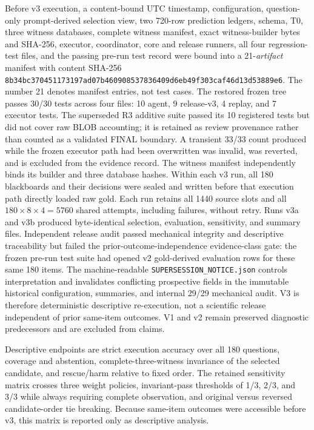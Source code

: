 \documentclass[applsci,article,submit,moreauthors]{Definitions/mdpi}
\begin{document}
Before v3 execution, a content-bound UTC timestamp, configuration, question-only prompt-derived selection view, two 720-row prediction ledgers, schema, T0, three witness databases, complete witness manifest, exact witness-builder bytes and SHA-256, executor, coordinator, core and release runners, all four regression-test files, and the passing pre-run test record were bound into a 21-\emph{artifact} manifest with content SHA-256 \texttt{8b34bc370451173197ad07b460908537836409d6eb49f303caf46d13d53889e6}. The number 21 denotes manifest entries, not test cases. The restored frozen tree passes 30/30 tests across four files: 10 agent, 9 release-v3, 4 replay, and 7 executor tests. The superseded R3 additive suite passed its 10 registered tests but did not cover raw BLOB accounting; it is retained as review provenance rather than counted as a validated FINAL boundary. A transient 33/33 count produced while the frozen executor path had been overwritten was invalid, was reverted, and is excluded from the evidence record. The witness manifest independently binds its builder and three database hashes. Within each v3 run, all 180 blackboards and their decisions were sealed and written before that execution path directly loaded raw gold. Each run retains all 1440 source slots and all $180\times8\times4=5760$ shared attempts, including failures, without retry. Runs v3a and v3b produced byte-identical selection, evaluation, sensitivity, and summary files. Independent release audit passed mechanical integrity and descriptive traceability but failed the prior-outcome-independence evidence-class gate: the frozen pre-run test suite had opened v2 gold-derived evaluation rows for these same 180 items. The machine-readable \texttt{SUPERSESSION\_NOTICE.json} controls interpretation and invalidates conflicting prospective fields in the immutable historical configuration, summaries, and internal 29/29 mechanical audit. V3 is therefore deterministic descriptive re-execution, not a scientific release independent of prior same-item outcomes. V1 and v2 remain preserved diagnostic predecessors and are excluded from claims.

Descriptive endpoints are strict execution accuracy over all 180 questions, coverage and abstention, complete-three-witness invariance of the selected candidate, and rescue/harm relative to fixed order. The retained sensitivity matrix crosses three weight policies, invariant-pass thresholds of 1/3, 2/3, and 3/3 while always requiring complete observation, and original versus reversed candidate-order tie breaking. Because same-item outcomes were accessible before v3, this matrix is reported only as descriptive analysis.
\end{document}
